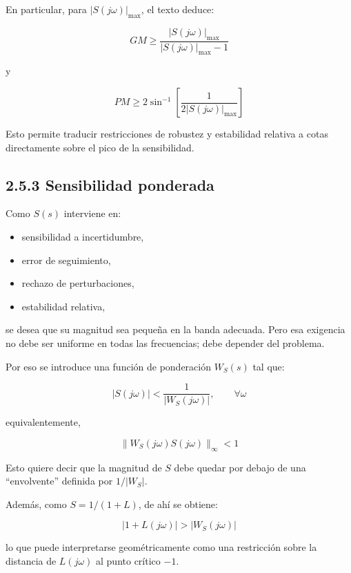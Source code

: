 En particular, para \(|S(j\omega)|_{\max}\), el texto deduce:

\[
GM \ge \frac{|S(j\omega)|_{\max}}{|S(j\omega)|_{\max}-1} \tag{2.5.12}
\]

y

\[
PM \ge 2\sin^{-1}\left[\frac{1}{2|S(j\omega)|_{\max}}\right] \tag{2.5.13}
\]

Esto permite traducir restricciones de robustez y estabilidad relativa a cotas directamente sobre el pico de la sensibilidad.

\subsection{2.5.3 Sensibilidad ponderada}
Como \(S(s)\) interviene en:

\begin{itemize}
  \item sensibilidad a incertidumbre,
  \item error de seguimiento,
  \item rechazo de perturbaciones,
  \item estabilidad relativa,
\end{itemize}

se desea que su magnitud sea pequeña en la banda adecuada. Pero esa exigencia no debe ser uniforme en todas las frecuencias; debe depender del problema.

Por eso se introduce una función de ponderación \(W_S(s)\) tal que:

\[
|S(j\omega)|<\frac{1}{|W_S(j\omega)|},\qquad \forall \omega \tag{2.5.15}
\]

equivalentemente,

\[
\|W_S(j\omega)S(j\omega)\|_\infty<1 \tag{2.5.16}
\]

Esto quiere decir que la magnitud de \(S\) debe quedar por debajo de una “envolvente” definida por \(1/|W_S|\).

Además, como \(S=1/(1+L)\), de ahí se obtiene:

\[
|1+L(j\omega)|>|W_S(j\omega)| \tag{2.5.17}
\]

lo que puede interpretarse geométricamente como una restricción sobre la distancia de \(L(j\omega)\) al punto crítico \(-1\).


